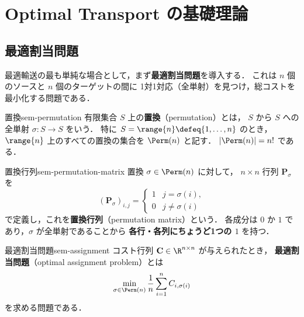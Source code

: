 \chapter{Optimal Transport の基礎理論}
\label{ch:seminar-01}

\section{最適割当問題}
\label{sec:sem-assignment}

最適輸送の最も単純な場合として，まず\textbf{最適割当問題}を導入する．
これは $n$ 個のソースと $n$ 個のターゲットの間に
1対1対応（全単射）を見つけ，総コストを最小化する問題である．

\begin{definition}{置換}{sem-permutation}
  有限集合 $S$ 上の\textbf{置換}（permutation）とは，
  $S$ から $S$ への全単射 $\sigma \colon S \to S$ をいう．
  特に $S = \range{n} \defeq \{1, \ldots, n\}$ のとき，
  $\range{n}$ 上のすべての置換の集合を $\Perm(n)$ と記す．
  $|\Perm(n)| = n!$ である．
\end{definition}

\begin{definition}{置換行列}{sem-permutation-matrix}
  置換 $\sigma \in \Perm(n)$ に対して，
  $n \times n$ 行列 $\mathbf{P}_\sigma$ を
  \[
    (\mathbf{P}_\sigma)_{i,j} =
    \begin{cases}
      1 & j = \sigma(i), \\
      0 & j \neq \sigma(i)
    \end{cases}
  \]
  で定義し，これを\textbf{置換行列}（permutation matrix）という．
  各成分は $0$ か $1$ であり，$\sigma$ が全単射であることから
  \textbf{各行・各列にちょうど1つの $1$} を持つ．
\end{definition}

\begin{definition}{最適割当問題}{sem-assignment}
  コスト行列 $\mathbf{C} \in \R^{n \times n}$ が与えられたとき，
  \textbf{最適割当問題}（optimal assignment problem）とは
  \[
    \min_{\sigma \in \Perm(n)} \frac{1}{n} \sum_{i=1}^{n} C_{i, \sigma(i)}
  \]
  を求める問題である．
\end{definition}

